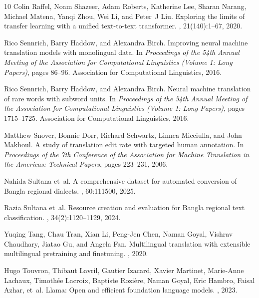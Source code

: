 \documentclass[12pt,a4paper]{article}
\begin{document}
\begin{thebibliography}{10}
Colin Raffel, Noam Shazeer, Adam Roberts, Katherine Lee, Sharan Narang, Michael
  Matena, Yanqi Zhou, Wei Li, and Peter~J Liu.
\newblock Exploring the limits of transfer learning with a unified text-to-text
  transformer.
, 21(140):1--67, 2020.

Rico Sennrich, Barry Haddow, and Alexandra Birch.
\newblock Improving neural machine translation models with monolingual data.
\newblock In {\em Proceedings of the 54th Annual Meeting of the Association for
  Computational Linguistics (Volume 1: Long Papers)}, pages 86--96. Association
  for Computational Linguistics, 2016.

Rico Sennrich, Barry Haddow, and Alexandra Birch.
\newblock Neural machine translation of rare words with subword units.
\newblock In {\em Proceedings of the 54th Annual Meeting of the Association for
  Computational Linguistics (Volume 1: Long Papers)}, pages 1715--1725.
  Association for Computational Linguistics, 2016.

Matthew Snover, Bonnie Dorr, Richard Schwartz, Linnea Micciulla, and John
  Makhoul.
\newblock A study of translation edit rate with targeted human annotation.
\newblock In {\em Proceedings of the 7th Conference of the Association for
  Machine Translation in the Americas: Technical Papers}, pages 223--231, 2006.

Nahida Sultana et~al.
\newblock A comprehensive dataset for automated conversion of {B}angla regional
  dialects.
, 60:111500, 2025.

Razia Sultana et~al.
\newblock Resource creation and evaluation for {B}angla regional text
  classification.
, 34(2):1120--1129, 2024.

Yuqing Tang, Chau Tran, Xian Li, Peng-Jen Chen, Naman Goyal, Vishrav Chaudhary,
  Jiatao Gu, and Angela Fan.
\newblock Multilingual translation with extensible multilingual pretraining and
  finetuning.
, 2020.

Hugo Touvron, Thibaut Lavril, Gautier Izacard, Xavier Martinet, Marie-Anne
  Lachaux, Timoth{\'e}e Lacroix, Baptiste Rozi{\`e}re, Naman Goyal, Eric
  Hambro, Faisal Azhar, et~al.
\newblock Llama: Open and efficient foundation language models.
, 2023.


\end{thebibliography}
\end{document}
